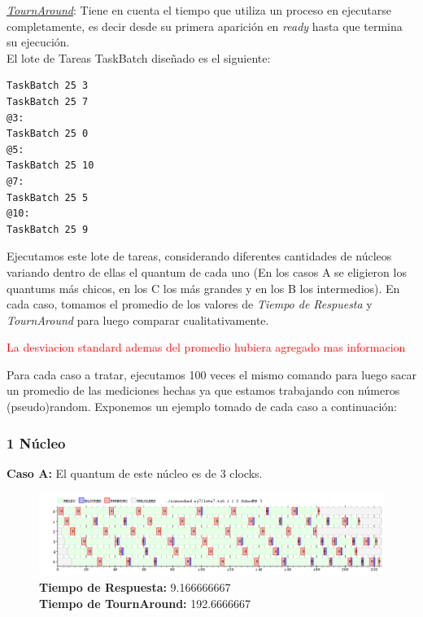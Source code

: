 \documentclass[a4paper]{article}
\begin{document}
\underline{\emph{TournAround}}: Tiene en cuenta el tiempo que utiliza un proceso en ejecutarse completamente, es decir desde su primera aparici\'on en \textit{ready} hasta que termina su ejecuci\'on.\\



El lote de Tareas TaskBatch dise\~nado es el siguiente:
	\begin{codesnippet}
	\begin{verbatim}
TaskBatch 25 3
TaskBatch 25 7
@3:
TaskBatch 25 0
@5:
TaskBatch 25 10
@7:
TaskBatch 25 5
@10:
TaskBatch 25 9
	\end{verbatim}
	\end{codesnippet}

	Ejecutamos este lote de tareas, considerando diferentes cantidades de n\'ucleos variando dentro de ellas el quantum de cada uno (En los casos A se eligieron los quantums m\'as chicos, en los C los m\'as grandes y en los B los intermedios). En cada caso, tomamos el promedio de los valores de \textit{Tiempo de Respuesta} y \textit{TournAround} para luego comparar cualitativamente.


\textcolor{red}{La desviacion standard ademas del promedio hubiera agregado mas informacion}

	
	Para cada caso a tratar, ejecutamos 100 veces el mismo comando para luego sacar un promedio de las mediciones hechas ya que estamos trabajando con n\'umeros (pseudo)random. Exponemos un ejemplo tomado de cada caso a continuaci\'on:
	
	\subsubsection*{1 N\'ucleo}
	
	\textbf{Caso A:} El quantum de este n\'ucleo es de 3 clocks.
	
	 \begin{figure}[h!]
   \begin{center}
 	\includegraphics[scale=0.5]{imagenes/ej7/1nucleoA.png}
 	\textbf{Tiempo de Respuesta:} 9.166666667\\
 	\textbf{Tiempo de TournAround:} 192.6666667\\
   \end{center}
 \end{figure} 
	
\end{document}

